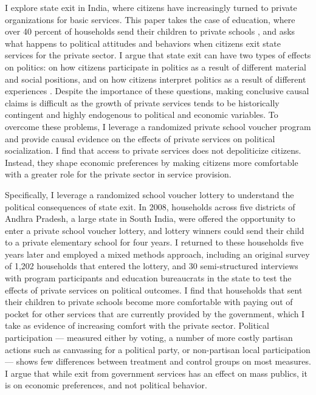 \documentclass[hidelinks, 12pt, titlepage]{article}
\begin{document}
	I explore state exit in India, where citizens have increasingly turned to private organizations for basic services.  This paper takes the case of education, where over 40 percent of households send their children to private schools \citep{ASER2019}, and asks what happens to political attitudes and behaviors when citizens exit state services for the private sector.  I argue that state exit can have two types of effects on politics: on how citizens participate in politics as a result of different material and social positions, and on how citizens interpret politics as a result of different experiences \citep{Pierson1993}.  Despite the importance of these questions, making conclusive causal claims is difficult as the growth of private services tends to be historically contingent and highly endogenous to political and economic variables.  To overcome these problems, I leverage a randomized private school voucher program and provide causal evidence on the effects of private services on political socialization.  I find that access to private services does not depoliticize citizens.  Instead, they shape economic preferences by making citizens more comfortable with a greater role for the private sector in service provision.

	Specifically, I leverage a randomized school voucher lottery to understand the political consequences of state exit.  In 2008, households across five districts of Andhra Pradesh, a large state in South India, were offered the opportunity to enter a private school voucher lottery, and lottery winners could send their child to a private elementary school for four years. I returned to these households five years later and employed a mixed methods approach, including an original survey of 1,202 households that entered the lottery, and 30 semi-structured interviews with program participants and education bureaucrats in the state to test the effects of private services on political outcomes.  I find that households that sent their children to private schools become more comfortable with paying out of pocket for other services that are currently provided by the government, which I take as evidence of increasing comfort with the private sector.  Political participation --- measured either by voting, a number of more costly partisan actions such as canvassing for a political party, or non-partisan local participation --- shows few differences between treatment and control groups on most measures.  I argue that while exit from government services has an effect on mass publics, it is on economic preferences, and not political behavior.
\end{document}
